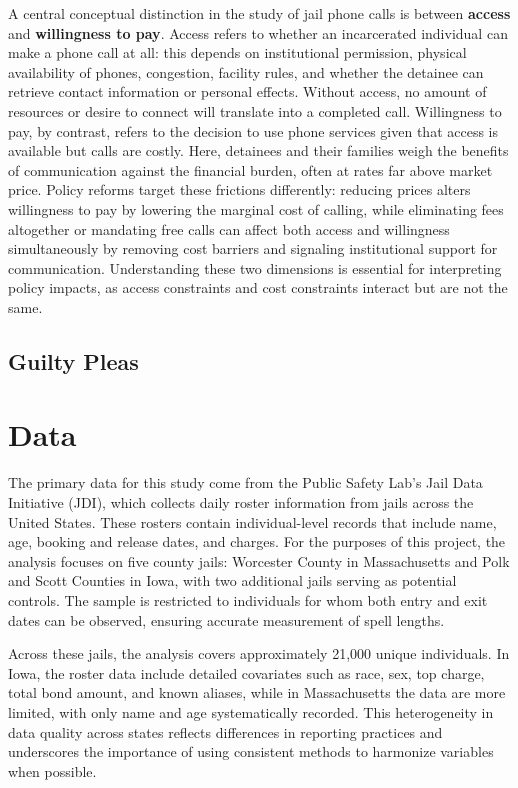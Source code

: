 \documentclass[12pt, a4paper]{article}
\begin{document}
A central conceptual distinction in the study of jail phone calls is between \textbf{access} and \textbf{willingness to pay}. 
Access refers to whether an incarcerated individual can make a phone call at all: this depends on institutional permission, physical availability of phones, congestion, facility rules, and whether the detainee can retrieve contact information or personal effects. Without access, no amount of resources or desire to connect will translate into a completed call. 
Willingness to pay, by contrast, refers to the decision to use phone services given that access is available but calls are costly. Here, detainees and their families weigh the benefits of communication against the financial burden, often at rates far above market price. 
Policy reforms target these frictions differently: reducing prices alters willingness to pay by lowering the marginal cost of calling, while eliminating fees altogether or mandating free calls can affect both access and willingness simultaneously by removing cost barriers and signaling institutional support for communication. 
Understanding these two dimensions is essential for interpreting policy impacts, as access constraints and cost constraints interact but are not the same.

\subsection{Guilty Pleas}



\section{Data}

The primary data for this study come from the Public Safety Lab’s Jail Data Initiative (JDI), which collects daily roster information from jails across the United States. These rosters contain individual-level records that include name, age, booking and release dates, and charges. For the purposes of this project, the analysis focuses on five county jails: Worcester County in Massachusetts and Polk and Scott Counties in Iowa, with two additional jails serving as potential controls. The sample is restricted to individuals for whom both entry and exit dates can be observed, ensuring accurate measurement of spell lengths.

Across these jails, the analysis covers approximately 21,000 unique individuals. In Iowa, the roster data include detailed covariates such as race, sex, top charge, total bond amount, and known aliases, while in Massachusetts the data are more limited, with only name and age systematically recorded. This heterogeneity in data quality across states reflects differences in reporting practices and underscores the importance of using consistent methods to harmonize variables when possible.
\end{document}
